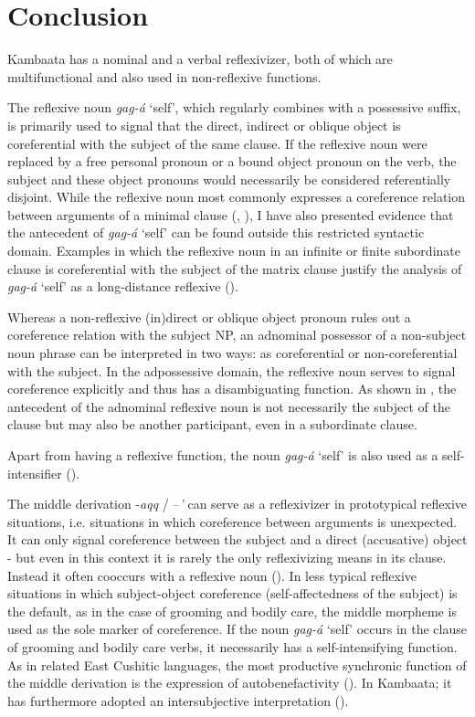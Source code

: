 \documentclass[output=paper]{langscibook}
\begin{document}
\section{Conclusion}\label{sec:treis:5}

Kambaata has a nominal and a verbal reflexivizer, both of which are multifunctional and also used in non-reflexive functions. 

The reflexive noun \textit{gag-á} ‘self’, which regularly combines with a possessive suffix, is primarily used to signal that the direct, indirect or oblique object is coreferential with the subject of the same clause. If the reflexive noun were replaced by a free personal pronoun or a bound object pronoun on the verb, the subject and these object pronouns would necessarily be considered referentially disjoint. 
While the reflexive noun most commonly expresses a coreference relation between arguments of a minimal clause (, ), I have also presented evidence that the antecedent of \textit{gag-á} `self' can be found outside this restricted syntactic domain. Examples in which the reflexive noun in an infinite or finite subordinate clause is coreferential with the subject of the matrix clause justify the analysis of \textit{gag-á} `self' as a long-distance reflexive ().

Whereas a non-reflexive (in)direct or oblique object pronoun rules out a coreference relation with the subject NP, an adnominal possessor of a non-subject noun phrase can be interpreted in two ways: as coreferential or non-coreferential with the subject. In the adpossessive domain, the reflexive noun serves to signal coreference explicitly and thus has a disambiguating function. As shown in , the antecedent of the adnominal reflexive noun is not necessarily the subject of the clause but may also be another participant, even in a subordinate clause. 

Apart from having a reflexive function, the noun \textit{gag-á} ‘self’ is also used as a self-intensifier ().

The middle derivation -\textit{aqq} / –\textit{’} can serve as a reflexivizer in prototypical reflexive situations, i.e. situations in which coreference between arguments is unexpected. It can only signal coreference between the subject and a direct (accusative) object - but even in this context it is rarely the only reflexivizing means in its clause. Instead it often cooccurs with a reflexive noun (). In less typical reflexive situations in which subject-object coreference (self-affectedness of the subject) is the default, as in the case of grooming and bodily care, the middle morpheme is used as the sole marker of coreference. If the noun \textit{gag-á} ‘self’ occurs in the clause of grooming and bodily care verbs, it necessarily has a self-intensifying function. As in related East Cushitic languages, the most productive synchronic function of the middle derivation is the expression of autobenefactivity (). In Kambaata; it has furthermore adopted an intersubjective interpretation ().
\end{document}
